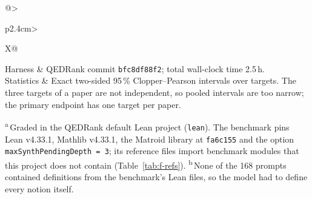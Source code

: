\documentclass[11pt]{article}
\begin{document}
\begin{table}[!htbp]
\begin{tabularx}{\linewidth}{@{}>{\raggedright\arraybackslash}p{2.4cm}>{\raggedright\arraybackslash}X@{}}
Harness & QEDRank commit \texttt{bfc8df88f2}; total wall-clock time 2.5\,h. \\
Statistics & Exact two-sided 95\,\% Clopper--Pearson intervals over targets. The three targets of a paper are not independent, so pooled intervals are too narrow; the primary endpoint has one target per paper. \\
\bottomrule
\end{tabularx}
\par\smallskip\parbox{\linewidth}{\footnotesize \textsuperscript{a}\,Graded in the QEDRank default Lean project (\texttt{lean}). The benchmark pins Lean v4.33.1, Mathlib v4.33.1, the Matroid library at \texttt{fa6c155} and the option \texttt{maxSynthPendingDepth = 3}; its reference files import benchmark modules that this project does not contain (Table~\ref{tab:f-refs}). \textsuperscript{b}\,None of the 168 prompts contained definitions from the benchmark's Lean files, so the model had to define every notion itself.}
\end{table}
\end{document}

